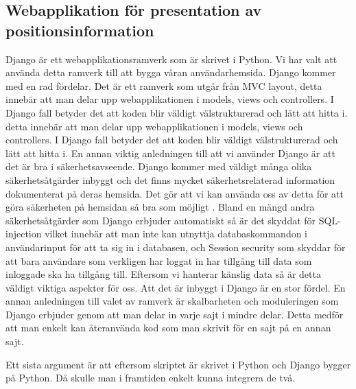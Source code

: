 \documentclass[swedish, a4paper,12pt]{article}
\begin{document}
\subsection{Webapplikation för presentation av positionsinformation}
Django är ett webapplikationsramverk som är skrivet i Python. Vi har valt att använda detta ramverk till att bygga våran användarhemsida. Django kommer med en rad fördelar. Det är ett ramverk som utgår från MVC layout, %
detta innebär att man delar upp webapplikationen i models, views och controllers. I Django fall betyder det att koden blir väldigt välstrukturerad och lätt att hitta i.	 detta innebär att man delar upp
 webapplikationen i models, views och controllers. I Django fall betyder det att koden blir väldigt välstrukturerad och lätt att hitta i.
En annan viktig anledningen till att vi använder Django är att det är bra i säkerhetsavseende. Django kommer med väldigt många olika säkerhetsåtgärder inbyggt och det finns mycket säkerhetsrelaterad information dokumenterat på deras hemsida. Det gör att vi kan använda oss av detta för att göra säkerheten på hemsidan så bra som möjligt \cite{securityInDjango}. Bland en mängd andra säkerhetsåtgärder som Django erbjuder automatiskt så är det skyddat för SQL-injection %
vilket innebär att man inte kan utnyttja databaskommandon i användarinput för att ta sig in i databasen, och Session security %
 som skyddar för att bara användare som verkligen har loggat in har tillgång till data som inloggade ska ha tillgång till.
Eftersom vi hanterar känslig data så är detta väldigt viktiga aspekter för oss. Att det är inbyggt i Django är en stor fördel. En annan anledningen till valet av ramverk är skalbarheten och moduleringen som Django erbjuder genom att man delar in varje sajt i mindre delar. Detta medför att man enkelt kan återanvända kod som man skrivit för en sajt på en annan sajt.

 Ett sista argument är att eftersom skriptet är skrivet i Python och Django bygger på Python. Då skulle man i framtiden enkelt kunna integrera de två.

\iffalse
\end{document}
